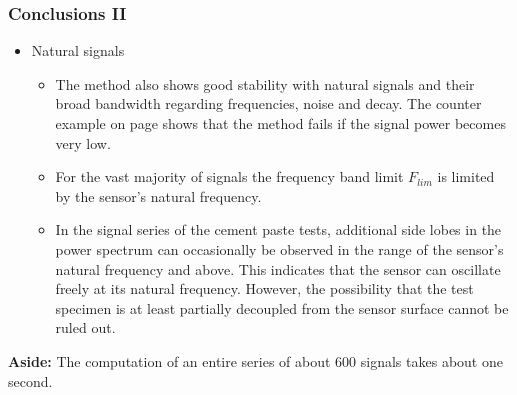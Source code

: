 \documentclass[11pt,aspectratio=169]{beamer}
\begin{document}
		\begin{frame}
		\frametitle{Conclusions II}
		\begin{itemize}
			\item \parbox{50mm}{\textcolor{RIPtitlecol}{Natural signals}}
			\begin{itemize}
				\item The method also shows good stability with natural signals and their broad bandwidth regarding frequencies, noise and decay. The counter example on page \pageref{res:counterexample} shows that the method fails if the signal power becomes very low.
				\item For the vast majority of signals the frequency band limit $F_{lim}$ is limited by the sensor's natural frequency.
				\item In the signal series of the cement paste tests, additional side lobes in the power spectrum can occasionally be observed in the range of the sensor's natural frequency and above. This indicates that the sensor can oscillate freely at its natural frequency. However, the possibility that the test specimen is at least partially decoupled from the sensor surface cannot be ruled out.
			\end{itemize}
		\end{itemize}
		\textbf{Aside:} The computation of an entire series of about 600 signals takes about one second.
	\end{frame}
\end{document}
